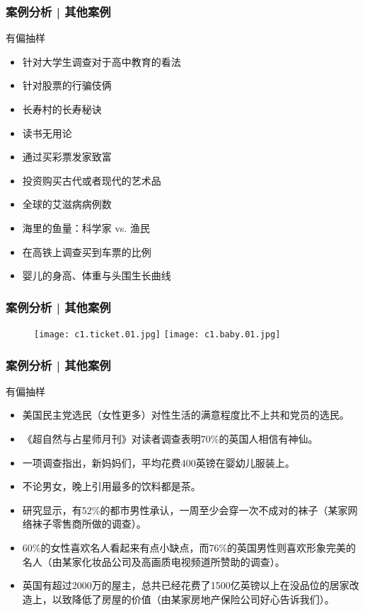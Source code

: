 \begin{frame}
  \frametitle{案例分析 | 其他案例}
  \begin{block}{有偏抽样}
    \begin{itemize}
      \item 针对大学生调查对于高中教育的看法
      \item 针对股票的行骗伎俩
      \item 长寿村的长寿秘诀
      \item 读书无用论
      \item 通过买彩票发家致富
      \item 投资购买古代或者现代的艺术品
      \item 全球的艾滋病病例数
      \item 海里的鱼量：科学家 vs. 渔民
      \item 在高铁上调查买到车票的比例
      \item 婴儿的身高、体重与头围生长曲线
    \end{itemize}
  \end{block}
\end{frame}

\begin{frame}
  \frametitle{案例分析 | 其他案例}
    \begin{figure}
      \centering
      \texttt{[image: c1.ticket.01.jpg]}\quad
      \texttt{[image: c1.baby.01.jpg]}
    \end{figure}
\end{frame}

\begin{frame}
  \frametitle{案例分析 | 其他案例}
  \begin{block}{有偏抽样}
    \begin{itemize}
      \item 美国民主党选民（女性更多）对性生活的满意程度比不上共和党员的选民。
      \item 《超自然与占星师月刊》对读者调查表明70\%的英国人相信有神仙。
      \item 一项调查指出，新妈妈们，平均花费400英镑在婴幼儿服装上。
      \item 不论男女，晚上引用最多的饮料都是茶。
      \item 研究显示，有52\%的都市男性承认，一周至少会穿一次不成对的袜子（某家网络袜子零售商所做的调查）。
      \item 60\%的女性喜欢名人看起来有点小缺点，而76\%的英国男性则喜欢形象完美的名人（由某家化妆品公司及高画质电视频道所赞助的调查）。
      \item 英国有超过2000万的屋主，总共已经花费了1500亿英镑以上在没品位的居家改造上，以致降低了房屋的价值（由某家房地产保险公司好心告诉我们）。
    \end{itemize}
  \end{block}
\end{frame}

